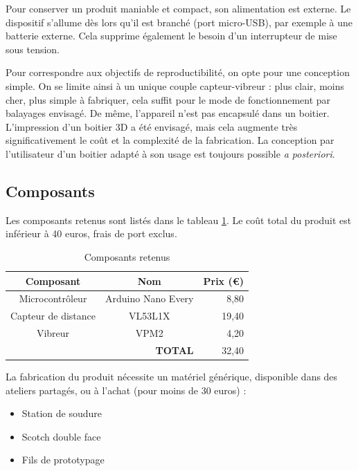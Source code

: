 \documentclass[a4paper, 11pt]{article}
\begin{document}
\par Pour conserver un produit maniable et compact, son alimentation est externe. Le dispositif s'allume dès lors qu'il est branché (port micro-USB), par exemple à une batterie externe. Cela supprime également le besoin d'un interrupteur de mise sous tension.

\par Pour correspondre aux objectifs de reproductibilité, on opte pour une conception simple. On se limite ainsi à un unique couple capteur-vibreur : plus clair, moins cher, plus simple à fabriquer, cela suffit pour le mode de fonctionnement par balayages envisagé. De même, l'appareil n'est pas encapsulé dans un boitier. L'impression d'un boitier 3D a été envisagé, mais cela augmente très significativement le coût et la complexité de la fabrication. La conception par l'utilisateur d'un boitier adapté à son usage est toujours possible \textit{a posteriori}.


\subsection{Composants}

\par Les composants retenus sont listés dans le tableau \ref{composants}. Le coût total du produit est inférieur à 40 euros, frais de port exclus.

\begin{table}[h!]
\centering
\begin{tabular}{ccr}
\hline
{\bf Composant} & {\bf Nom} & {\bf Prix (€)} \\
\hline
Microcontrôleur & Arduino Nano Every & 8,80 \\
Capteur de distance & VL53L1X & 19,40 \\
Vibreur & VPM2 & 4,20 \\
\hline
\multicolumn{2}{r}{\bf TOTAL} & 32,40 \\
\hline
\end{tabular}
\caption{Composants retenus}
\label{composants}
\end{table}

\par La fabrication du produit nécessite un matériel générique, disponible dans des ateliers partagés, ou à l'achat (pour moins de 30 euros) :

\begin{itemize}
\item Station de soudure
\item Scotch double face
\item Fils de prototypage
\end{itemize}
\end{document}
